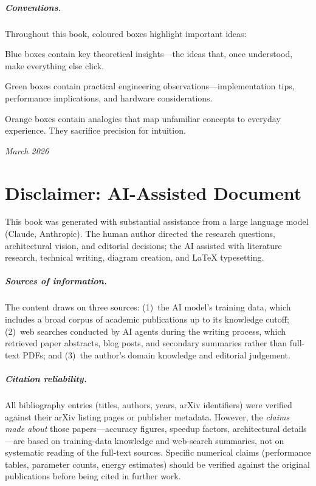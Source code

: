 \documentclass[11pt,a4paper,twoside,openright]{book}
\begin{document}
\paragraph{Conventions.}
Throughout this book, coloured boxes highlight important ideas:
\begin{keyinsight}
Blue boxes contain key theoretical insights---the ideas that, once
understood, make everything else click.
\end{keyinsight}
\begin{engineernote}
Green boxes contain practical engineering observations---implementation
tips, performance implications, and hardware considerations.
\end{engineernote}
\begin{analogy}
Orange boxes contain analogies that map unfamiliar concepts to everyday
experience. They sacrifice precision for intuition.
\end{analogy}

\vfill
\noindent\textit{March 2026}

\chapter*{Disclaimer: AI-Assisted Document}

This book was generated with substantial assistance from a large
language model (Claude, Anthropic). The human author directed the
research questions, architectural vision, and editorial decisions;
the AI assisted with literature research, technical writing, diagram
creation, and \LaTeX{} typesetting.

\paragraph{Sources of information.}
The content draws on three sources: (1)~the AI model's training data,
which includes a broad corpus of academic publications up to its
knowledge cutoff; (2)~web searches conducted by AI agents during the
writing process, which retrieved paper abstracts, blog posts, and
secondary summaries rather than full-text PDFs; and (3)~the author's
domain knowledge and editorial judgement.

\paragraph{Citation reliability.}
All bibliography entries (titles, authors, years, arXiv identifiers)
were verified against their arXiv listing pages or publisher metadata.
However, the \emph{claims made about} those papers---accuracy figures,
speedup factors, architectural details---are based on training-data
knowledge and web-search summaries, not on systematic reading of the
full-text sources. Specific numerical claims (performance tables,
parameter counts, energy estimates) should be verified against the
original publications before being cited in further work.
\end{document}
